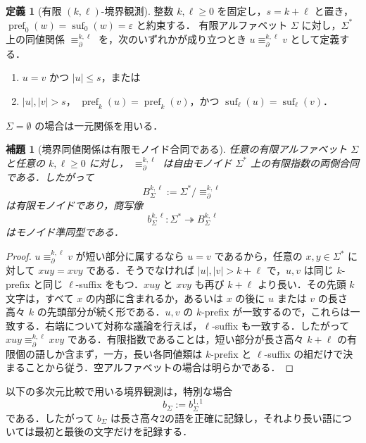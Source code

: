 \documentclass[11pt,a4paper]{ltjsarticle}
\numberwithin{equation}{section}
\theoremstyle{plain}
\newtheorem{lemma}[theorem]{補題}
\theoremstyle{definition}
\newtheorem{definition}[theorem]{定義}
\theoremstyle{remark}
\newcommand{\eps}{\varepsilon}
\begin{document}
\begin{definition}[有限 \((k,\ell)\)-境界観測]
\label{def:boundary-observation}
整数 \(k,\ell\ge0\) を固定し，\(s=k+\ell\) と置き，
\(\operatorname{pref}_0(w)=\operatorname{suf}_0(w)=\eps\) と約束する．
有限アルファベット \(\Sigma\) に対し，\(\Sigma^*\) 上の同値関係
\(\equiv_{\partial}^{k,\ell}\) を，次のいずれかが成り立つとき
\(u\equiv_{\partial}^{k,\ell}v\) として定義する．
\begin{enumerate}[label=(\roman*),leftmargin=*]
\item \(u=v\) かつ \(|u|\le s\)，または
\item \(|u|,|v|>s\)，
\(\operatorname{pref}_k(u)=\operatorname{pref}_k(v)\)，かつ
\(\operatorname{suf}_\ell(u)=\operatorname{suf}_\ell(v)\)．
\end{enumerate}
\(\Sigma=\emptyset\) の場合は一元関係を用いる．
\end{definition}

\begin{lemma}[境界同値関係は有限モノイド合同である]
\label{lem:boundary-congruence}
任意の有限アルファベット $\Sigma$ と任意の $k,\ell\ge0$ に対し，
$\equiv_{\partial}^{k,\ell}$ は自由モノイド $\Sigma^*$ 上の有限指数の両側合同である．したがって
\[
  B_\Sigma^{k,\ell}:=\Sigma^*/{\equiv_{\partial}^{k,\ell}}
\]
は有限モノイドであり，商写像
\[
  b_\Sigma^{k,\ell}:\Sigma^*\twoheadrightarrow B_\Sigma^{k,\ell}
\]
はモノイド準同型である．
\end{lemma}

\begin{proof}
$u\equiv_{\partial}^{k,\ell}v$ が短い部分に属するなら $u=v$ であるから，任意の $x,y\in\Sigma^*$ に対して $xuy=xvy$ である．そうでなければ $|u|,|v|>k+\ell$ で，$u,v$ は同じ $k$-prefix と同じ $\ell$-suffix をもつ．$xuy$ と $xvy$ も再び $k+\ell$ より長い．その先頭 $k$ 文字は，すべて $x$ の内部に含まれるか，あるいは $x$ の後に $u$ または $v$ の長さ高々 $k$ の先頭部分が続く形である．$u,v$ の $k$-prefix が一致するので，これらは一致する．右端について対称な議論を行えば，$\ell$-suffix も一致する．したがって $xuy\equiv_{\partial}^{k,\ell}xvy$ である．有限指数であることは，短い部分が長さ高々 $k+\ell$ の有限個の語しか含まず，一方，長い各同値類は $k$-prefix と $\ell$-suffix の組だけで決まることから従う．空アルファベットの場合は明らかである．
\end{proof}

以下の多次元比較で用いる境界観測は，特別な場合
\[
  b_\Sigma:=b_\Sigma^{1,1}
\]
である．したがって \(b_\Sigma\) は長さ高々2の語を正確に記録し，それより長い語については最初と最後の文字だけを記録する．
\end{document}
